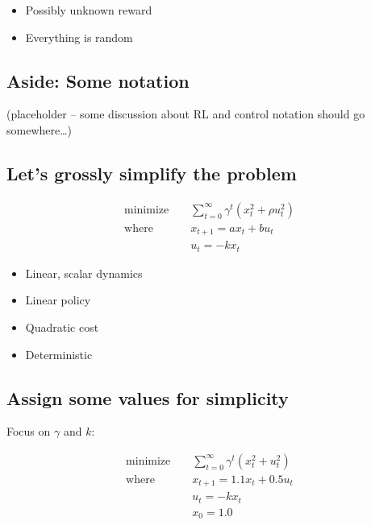 \documentclass[
  letterpaper,
  DIV=11,
  numbers=noendperiod,
  oneside]{scrartcl}
\providecommand{\tightlist}{%
  \setlength{\itemsep}{0pt}\setlength{\parskip}{0pt}}\usepackage{longtable,booktabs,array}
\begin{document}
\begin{itemize}
\tightlist
\item
  Possibly unknown reward
\item
  Everything is random
\end{itemize}

\subsection{Aside: Some notation}\label{aside-some-notation}

(placeholder -- some discussion about RL and control notation should go
somewhere\ldots)

\subsection{Let's grossly simplify the
problem}\label{lets-grossly-simplify-the-problem}

\begin{align}
\text{minimize } && \sum_{t=0}^{\infty} \gamma^t \left( x_t^2 + \rho u_t^2 \right)\\
\text{where } && x_{t+1} = a x_t + b u_t \\
&& u_t = -k x_t
\end{align}

\begin{itemize}
\tightlist
\item
  Linear, scalar dynamics
\item
  Linear policy
\end{itemize}

\begin{itemize}
\tightlist
\item
  Quadratic cost
\item
  Deterministic
\end{itemize}

\subsection{Assign some values for
simplicity}\label{assign-some-values-for-simplicity}

Focus on \(\gamma\) and \(k\):

\begin{align}
\text{minimize } && \sum_{t=0}^{\infty} \gamma^t \left( x_t^2 + u_t^2 \right)\\
\text{where } && x_{t+1} = 1.1 x_t + 0.5 u_t \\
&& u_t = -k x_t \\
&& x_0 = 1.0
\end{align}
\end{document}
